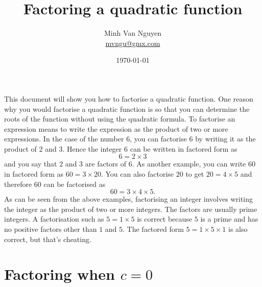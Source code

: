 \documentclass[a4paper,oneside,12pt]{article}
\begin{document}
\title{\Large\bf Factoring a quadratic function}
\author{%
  Minh Van Nguyen \\
  \url{mvngu@gmx.com}
}
\date{\today}
\maketitle

\noindent
This document will show you how to factorise a quadratic function.
One reason why you would factorise a quadratic function is so that you
can determine the roots of the function without using the quadratic
formula.  To factorise an expression means to write the expression as
the product of two or more expressions.  In the case of the number
$6$, you can factorise $6$ by writing it as the product of $2$ and
$3$.  Hence the integer $6$ can be written in factored form as
\[
6
=
2 \times 3
\]
and you say that $2$ and $3$ are factors of $6$.  As another example,
you can write $60$ in factored form as $60 = 3 \times 20$.  You can
also factorise $20$ to get $20 = 4 \times 5$ and therefore $60$ can be
factorised as
\[
60
=
3 \times 4 \times 5.
\]
As can be seen from the above examples, factorising an integer
involves writing the integer as the product of two or more integers.
The factors are usually prime integers.  A factorisation such as
$5 = 1 \times 5$ is correct because $5$ is a prime and has no positive
factors other than $1$ and $5$.  The factored form
$5 = 1 \times 5 \times 1$ is also correct, but that's cheating.



\section{Factoring when $c = 0$}
\end{document}
